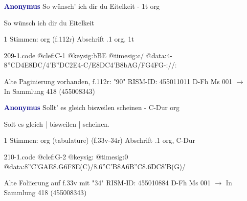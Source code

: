 \documentclass[twocolumn]{book}
\begin{document}
\newline \par \vspace{7pt} \textcolor{darkblue}{\textbf{Anonymus  }}
\newline So wünsch' ich dir du Eitelkeit - 1t
\newline org
\newline \begin{itshape}[f.112r, heading:] So wünsch ich dir du Eitelkeit\end{itshape} 
\newline \textcolor{darkblue}{}  1 Stimmen: org  (f.112r)
\newline Abschrift
.1  org, 1t  
\begin{filecontents*}{209-1.code}
@clef:C-1
@keysig:bBE
@timesig:c/
@data:4-{8''CD}4E{8DC}/4'B''DC2E4-C/E{8DC}4'B{8bAG}/{FG}4FG-://:
\end{filecontents*}
\newline
%
\newline Alte Paginierung vorhanden, f.112r: "90"
\newline RISM-ID: 455011011
\newline D-Fh  Ms 001
\newline $\rightarrow$ In Sammlung 418 (455008343)
      
\newline \par \vspace{7pt} \textcolor{darkblue}{\textbf{Anonymus  }}
\newline Sollt' es gleich bisweilen scheinen - C-Dur
\newline org
\newline \begin{itshape}[f.33v, at left:] Solt es gleich | bisweilen | scheinen.\end{itshape} 
\newline \textcolor{darkblue}{}  1 Stimmen: org (tabulature)  (f.33v-34r)
\newline Abschrift
.1  org, C-Dur  
\begin{filecontents*}{210-1.code}
@clef:G-2
@keysig:
@timesig:0
@data:{8''C'GAE}{8.G6F8E(C)}/{8.6''C'B8A6B''C}{8.6DC8'B(G)}/
\end{filecontents*}
\newline
%
\newline Alte Foliierung auf f.33v mit "34"
\newline RISM-ID: 455010884
\newline D-Fh  Ms 001
\newline $\rightarrow$ In Sammlung 418 (455008343)
      
\end{document}
